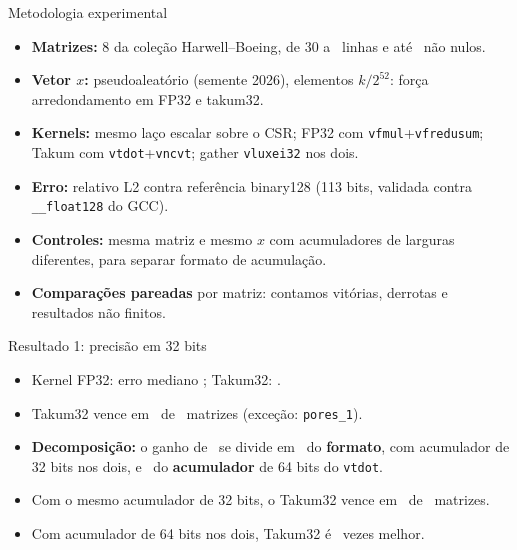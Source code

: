 \documentclass[aspectratio=169,10pt]{beamer}
\begin{document}
\begin{frame}{Metodologia experimental}
	\begin{itemize}
		\item \textbf{Matrizes:} 8 da coleção Harwell--Boeing, de 30 a
		      \MaxLinhas\ linhas e até \MaxNnz\ não nulos.
		\item \textbf{Vetor $x$:} pseudoaleatório (semente 2026), elementos
		      $k/2^{52}$: força arredondamento em FP32 e takum32.
		\item \textbf{Kernels:} mesmo laço escalar sobre o CSR; FP32 com
		      \texttt{vfmul}+\texttt{vfredusum}; Takum com
		      \texttt{vtdot}+\texttt{vncvt}; gather \texttt{vluxei32} nos dois.
		\item \textbf{Erro:} relativo L2 contra referência binary128
		      (113 bits, validada contra \texttt{\_\_float128} do GCC).
		\item \textbf{Controles:} mesma matriz e mesmo $x$ com acumuladores de
		      larguras diferentes, para separar formato de acumulação.
		\item \textbf{Comparações pareadas} por matriz: contamos vitórias,
		      derrotas e resultados não finitos.
	\end{itemize}
\end{frame}

\begin{frame}{Resultado 1: precisão em 32 bits}
	\begin{itemize}
		\item Kernel FP32: erro mediano \MedFPtrinta; Takum32: \MedTakumTrinta.
		\item Takum32 vence em \ParTrintaFPTakumVence\ de \ParTrintaFPAmbos\
		      matrizes (exceção: \texttt{pores\_1}).
		\item \textbf{Decomposição:} o ganho de \RazaoKernelTrinta\ se divide em
		      \RazaoFormatoAcTrinta\ do \textbf{formato}, com acumulador de 32
		      bits nos dois, e \RazaoAcumuladorTakum\ do \textbf{acumulador} de
		      64 bits do \texttt{vtdot}.
		\item Com o mesmo acumulador de 32 bits, o Takum32 vence em
		      \ParTrintaAcFPTakumVence\ de \ParTrintaAcFPAmbos\ matrizes.
		\item Com acumulador de 64 bits nos dois, Takum32 é
		      \RazaoAcAmpliadoTrinta\ vezes melhor.
	\end{itemize}
\end{frame}
\end{document}
